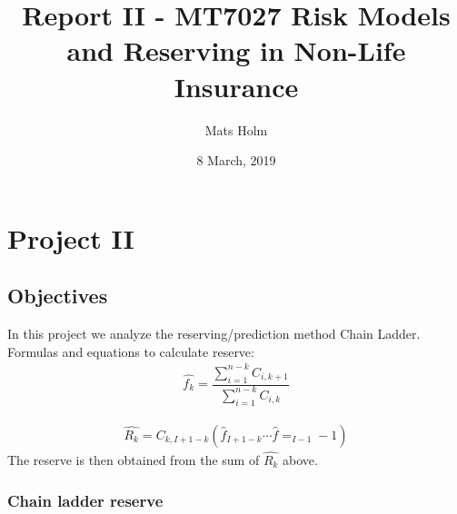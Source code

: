 \documentclass[a4paper]{article}
\title{Report II - MT7027 Risk Models and Reserving in Non-Life Insurance}
\author{Mats Holm}
\date{8 March, 2019}                                           %
\begin{document}
\maketitle
\section*{Project II}
\subsection*{Objectives}
In this project we analyze the reserving/prediction method Chain Ladder.
\\


Formulas and equations to calculate reserve:
\begin{align*}
	\hat{f_k} = \dfrac{\sum_{i=1}^{n-k} C_{i,k+1}} {\sum_{i=1}^{n-k} C_{i,k}}
\end{align*}

\begin{align*}
	\hat{R_k} = C_{k,I+1-k} \left(  \hat{f}_{I+1-k} \cdots \hat{f}=_{I-1}-1\right)
\end{align*}
The reserve is then obtained from the sum of $\hat{R_k}$ above.

\subsubsection*{Chain ladder reserve}
\end{document}
